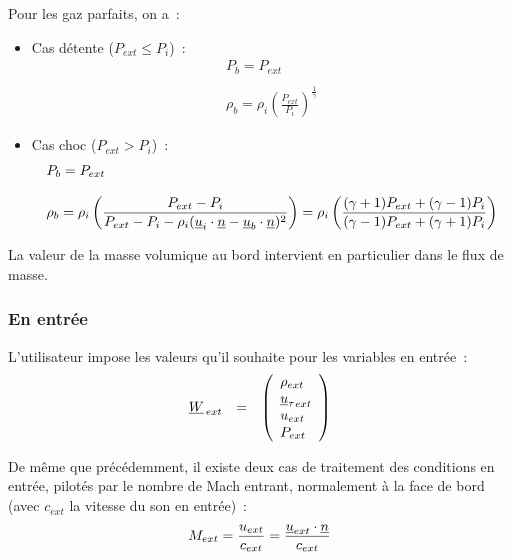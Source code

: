\begin{enumerate}
\bigskip
Pour les gaz parfaits, on a~:
\begin{itemize}

\item Cas d\'etente ($P_{ext} \leqslant P_i$)~:\\
$$
\begin{array}{l}
P_b=P_{ext}\\
\\
\rho_b=\rho_i \left(\displaystyle\frac{P_{ext}}{P_i}\right)^{\frac{1}{\gamma}}
\end{array}
$$

\item Cas choc ($P_{ext} > P_i$)~:\\
$$
\begin{array}{l}
P_b=P_{ext}\\
\\
\rho_b=\rho_i \left(\displaystyle\frac{P_{ext}-P_i}{P_{ext}-P_i-\rho_i
(\underline{u}_i \cdot \underline{n} - \underline{u}_b \cdot \underline{n})^2}\right)
= \rho_i \left(\displaystyle\frac{(\gamma+1)P_{ext}+(\gamma-1)P_i}
{(\gamma-1)P_{ext}+(\gamma+1)P_i}\right)\\
\end{array}
$$

\end{itemize}

\end{enumerate}

La valeur de la masse volumique au bord intervient en particulier
dans le flux de masse.


\subsubsection*{En entr\'ee}

L'utilisateur impose les valeurs qu'il souhaite pour les variables
en entr\'ee~:
$$
\begin{array}{lllll}
\underline{W}_{\,ext} &=&
\left(\begin{array}{l}
\rho_{ext}\\ {\underline{u}_\tau}_{ext}\\ u_{ext}\\ P_{ext}
\end{array}\right)
\end{array}
$$

De m\^eme que pr\'ec\'edemment, il existe deux cas de traitement
des conditions en entr\'ee,
pilot\'es par le nombre de Mach entrant, normalement \`a la face de bord
(avec $c_{ext}$ la vitesse du son en entr\'ee)~:
$$M_{ext} = \displaystyle\frac{u_{ext}}{c_{ext}}
= \displaystyle\frac{\underline{u}_{ext} \cdot \underline{n}}{c_{ext}}$$

